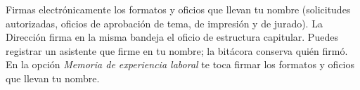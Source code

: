 \documentclass[11pt,a4paper]{article}
\begin{document}
{\small\tableofcontents}
\newpage
\begin{quevasahacer}
Firmas electrónicamente los formatos y oficios que llevan tu nombre (solicitudes autorizadas, oficios de aprobación de tema, de impresión y de jurado). La Dirección firma en la misma bandeja el oficio de estructura capitular. Puedes registrar un asistente que firme en tu nombre; la bitácora conserva quién firmó. En la opción \emph{Memoria de experiencia laboral} te toca firmar los formatos y oficios que llevan tu nombre.
\end{quevasahacer}



\end{document}
